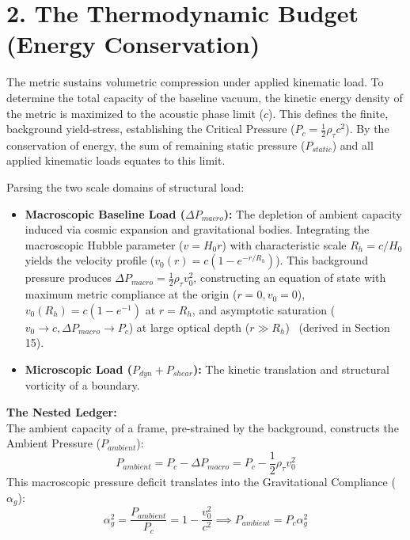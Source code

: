 
\section*{2. The Thermodynamic Budget (Energy Conservation)} 
The metric sustains volumetric compression under applied kinematic load. To determine the total capacity of the baseline vacuum, the kinetic energy density of the metric is maximized to the acoustic phase limit ($c$). This defines the finite, background yield-stress, establishing the Critical Pressure ($P_c = \frac{1}{2}\rho_\tau c^2$). By the conservation of energy, the sum of remaining static pressure ($P_{static}$) and all applied kinematic loads equates to this limit. 

Parsing the two scale domains of structural load:
\begin{itemize}
    \item \textbf{Macroscopic Baseline Load ($\Delta P_{macro}$):} The depletion of ambient capacity induced via cosmic expansion and gravitational bodies. Integrating the macroscopic Hubble parameter ($v = H_0 r$) with characteristic scale $R_h = c/H_0$ yields the velocity profile ($v_0(r) = c(1 - e^{-r/R_h})$). This background pressure produces $\Delta P_{macro} = \frac{1}{2}\rho_\tau v_0^2$, constructing an equation of state with maximum metric compliance at the origin ($r=0, v_0=0$), $v_0(R_h) = c(1 - e^{-1})$ at $r = R_h$, and asymptotic saturation ($v_0 \to c, \Delta P_{macro} \to P_c$) at large optical depth ($r \gg R_h$)~\cite{BairMosheh2026} (derived in Section 15). %
    \item \textbf{Microscopic Load ($P_{dyn} + P_{shear}$):} The kinetic translation and structural vorticity of a boundary.
\end{itemize}

\textbf{The Nested Ledger:}\\
The ambient capacity of a frame, pre-strained by the background, constructs the Ambient Pressure ($P_{ambient}$): 
\begin{equation}
    P_{ambient} = P_c - \Delta P_{macro} = P_c - \frac{1}{2}\rho_\tau v_0^2
\end{equation}
This macroscopic pressure deficit translates into the Gravitational Compliance ($\alpha_g$):
\begin{equation}
    \alpha_g^2 = \frac{P_{ambient}}{P_c} = 1 - \frac{v_0^2}{c^2} \implies P_{ambient} = P_c \alpha_g^2
\end{equation}

